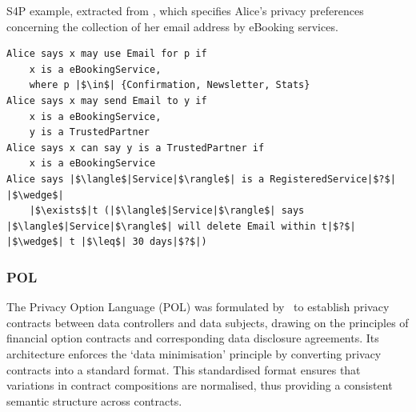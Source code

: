 \begin{listing}
\caption{S4P example, extracted from \cite{becker_framework_2009}, which specifies Alice's privacy preferences concerning the collection of her email address by eBooking services.}
\label{list:s4p_example}
\begin{verbatim}
Alice says x may use Email for p if
    x is a eBookingService,
    where p |$\in$| {Confirmation, Newsletter, Stats}
Alice says x may send Email to y if
    x is a eBookingService,
    y is a TrustedPartner
Alice says x can say y is a TrustedPartner if
    x is a eBookingService
Alice says |$\langle$|Service|$\rangle$| is a RegisteredService|$?$| |$\wedge$|
    |$\exists$|t (|$\langle$|Service|$\rangle$| says |$\langle$|Service|$\rangle$| will delete Email within t|$?$| |$\wedge$| t |$\leq$| 30 days|$?$|)
\end{verbatim}
\end{listing}

\subsubsection{POL}
\label{sec:pol}

The Privacy Option Language (POL) was formulated by~\cite{berthold_privacy_2013} to establish privacy contracts between data controllers and data subjects, drawing on the principles of financial option contracts and corresponding data disclosure agreements.
Its architecture enforces the `data minimisation' principle by converting privacy contracts into a standard format.
This standardised format ensures that variations in contract compositions are normalised, thus providing a consistent semantic structure across contracts.

